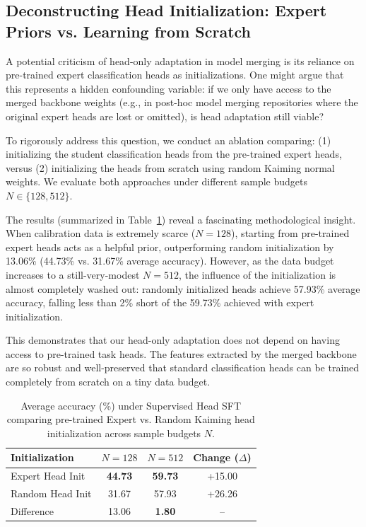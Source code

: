 \documentclass{article}
\theoremstyle{plain}
\theoremstyle{definition}
\theoremstyle{remark}
\begin{document}
\subsection{Deconstructing Head Initialization: Expert Priors vs. Learning from Scratch}
A potential criticism of head-only adaptation in model merging is its reliance on pre-trained expert classification heads as initializations. One might argue that this represents a hidden confounding variable: if we only have access to the merged backbone weights (e.g., in post-hoc model merging repositories where the original expert heads are lost or omitted), is head adaptation still viable?

To rigorously address this question, we conduct an ablation comparing: (1) initializing the student classification heads from the pre-trained expert heads, versus (2) initializing the heads from scratch using random Kaiming normal weights. We evaluate both approaches under different sample budgets $N \in \{128, 512\}$.

The results (summarized in Table~\ref{tab:head_init}) reveal a fascinating methodological insight. When calibration data is extremely scarce ($N=128$), starting from pre-trained expert heads acts as a helpful prior, outperforming random initialization by 13.06\% (44.73\% vs. 31.67\% average accuracy). However, as the data budget increases to a still-very-modest $N=512$, the influence of the initialization is almost completely washed out: randomly initialized heads achieve 57.93\% average accuracy, falling less than 2\% short of the 59.73\% achieved with expert initialization.

This demonstrates that our head-only adaptation does not depend on having access to pre-trained task heads. The features extracted by the merged backbone are so robust and well-preserved that standard classification heads can be trained completely from scratch on a tiny data budget.

\begin{table}[h]
\caption{Average accuracy (\%) under Supervised Head SFT comparing pre-trained Expert vs. Random Kaiming head initialization across sample budgets $N$.}
\label{tab:head_init}
\begin{center}
\footnotesize
\setlength{\tabcolsep}{4.0pt}
\begin{tabular}{lccc}
\toprule
\textbf{Initialization} & \textbf{$N=128$} & \textbf{$N=512$} & \textbf{Change ($\Delta$)} \\
\midrule
Expert Head Init & \textbf{44.73} & \textbf{59.73} & +15.00 \\
Random Head Init & 31.67 & 57.93 & +26.26 \\
\midrule
Difference & 13.06 & \textbf{1.80} & -- \\
\bottomrule
\end{tabular}
\end{center}
\end{table}
\end{document}
